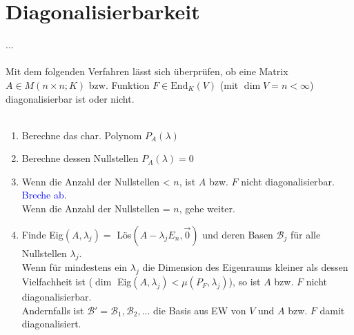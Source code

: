 \documentclass{article}
\begin{document}
\section{Diagonalisierbarkeit}
...\\
\\
Mit dem folgenden Verfahren lässt sich überprüfen, ob eine Matrix $A\in M(n\times n;K)$ bzw. Funktion $F\in\text{End}_K(V)$ (mit $\dim V = n < \infty$) diagonalisierbar ist oder nicht.\\
\\
	\begin{enumerate}
		\item Berechne das char. Polynom $P_A(\lambda)$
		
		
		\item Berechne dessen Nullstellen $P_A(\lambda) = 0$
		
		
		\item Wenn die Anzahl der Nullstellen < $n$, ist $A$ bzw. $F$ nicht diagonalisierbar. \textcolor{blue}{Breche ab}.\\
		Wenn die Anzahl der Nullstellen = $n$, gehe weiter.
		
		
		\item Finde Eig$(A,\lambda_j) = $ Lös$(A - \lambda_j E_n, \vec{0})$ und deren Basen $\mathcal{B}_j$ für alle Nullstellen $\lambda_j$.\\
		Wenn für mindestens ein $\lambda_j$ die Dimension des Eigenraums kleiner als dessen Vielfachheit ist ($\dim$ Eig$(A,\lambda_j) < \mu(P_F,\lambda_j)$), so ist $A$ bzw. $F$ nicht diagonalisierbar.\\
		Andernfalls ist $\mathcal{B}' = \mathcal{B}_1, \mathcal{B}_2, ...$ die Basis aus EW von $V$ und $A$ bzw. $F$ damit diagonalisiert.
	\end{enumerate}


\newpage
\end{document}
